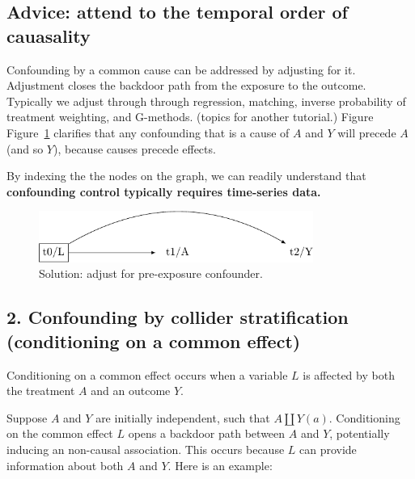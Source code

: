 \documentclass[
  singlecolumn]{report}
\begin{document}
\hypertarget{advice-attend-to-the-temporal-order-of-cauasality}{%
\subsection{Advice: attend to the temporal order of
cauasality}\label{advice-attend-to-the-temporal-order-of-cauasality}}

Confounding by a common cause can be addressed by adjusting for it.
Adjustment closes the backdoor path from the exposure to the outcome.
Typically we adjust through through regression, matching, inverse
probability of treatment weighting, and G-methods. (topics for another
tutorial.) Figure Figure~\ref{fig-dag-common-cause-solution} clarifies
that any confounding that is a cause of \(A\) and \(Y\) will precede
\(A\) (and so \(Y\)), because causes precede effects.

By indexing the the nodes on the graph, we can readily understand that
\textbf{confounding control typically requires time-series data.}

\begin{figure}

{\centering \includegraphics[width=0.8\textwidth,height=\textheight]{causal-dags_files/figure-pdf/fig-dag-common-cause-solution-1.pdf}

}

\caption{\label{fig-dag-common-cause-solution}Solution: adjust for
pre-exposure confounder.}

\end{figure}

\hypertarget{confounding-by-collider-stratification-conditioning-on-a-common-effect}{%
\subsection{2. Confounding by collider stratification (conditioning on a
common
effect)}\label{confounding-by-collider-stratification-conditioning-on-a-common-effect}}

Conditioning on a common effect occurs when a variable \(L\) is affected
by both the treatment \(A\) and an outcome \(Y\).

Suppose \(A\) and \(Y\) are initially independent, such that
\(A \coprod Y(a)\). Conditioning on the common effect \(L\) opens a
backdoor path between \(A\) and \(Y\), potentially inducing an
non-causal association. This occurs because \(L\) can provide
information about both \(A\) and \(Y\). Here is an example:
\end{document}
